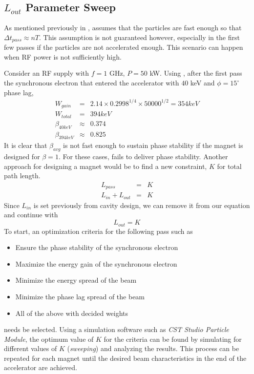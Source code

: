 \documentclass[a4paper,oneside,12pt]{report}
\numberwithin{equation}{chapter}
\begin{document}
\subsection{$L_{out}$ Parameter Sweep} \label{sec:parameter_sweep}

As mentioned previously in ,  assumes that the particles are fast enough so that $\Delta t_{pass} \approx n T$. 
This assumption is not guaranteed however, especially in the first few passes if the particles are not accelerated enough. 
This scenario can happen when RF power is not sufficiently high. 

Consider an RF supply with $f=1$ GHz, $P=50$ kW. Using , 
after the first pass the synchronous electron that entered the accelerator with $40$ keV and $\phi=15^\circ$ phase lag,
\begin{eqnarray*}
    W_{gain} &=& 2.14\times0.2998^{1/4}\times 50000^{1/2} = 354keV \\
    W_{total} &=& 394 keV \\
    \beta_{40keV} &\approx& 0.374 \\
    \beta_{394keV} &\approx& 0.825
\end{eqnarray*}
It is clear that $\beta_{avg}$ is not fast enough to sustain phase stability if the magnet is designed for $\beta = 1$. 
For these cases,  fails to deliver phase stability.
Another approach for designing a magnet would be to find a new constraint, $K$ for total path length.
\begin{eqnarray*}
    L_{pass} &=& K \\
    L_{in} + L_{out} &=& K
\end{eqnarray*}
Since $L_{in}$ is set previously from cavity design, we can remove it from our equation and continue with
\begin{equation} \label{eq:mag_sweep_constraint}
    L_{out} = K
\end{equation}
To start, an optimization criteria for the following pass such as
\begin{itemize}
    \item Ensure the phase stability of the synchronous electron
    \item Maximize the energy gain of the synchronous electron
    \item Minimize the energy spread of the beam
    \item Minimize the phase lag spread of the beam
    \item All of the above with decided weights
\end{itemize}
needs be selected. Using a simulation software such as \textit{CST Studio Particle Module}, the optimum value of $K$ for the criteria can be found by simulating for different values of $K$ (\textit{sweeping}) and analyzing the results.
This process can be repeated for each magnet until the desired beam characteristics in the end of the accelerator are achieved.
\end{document}
